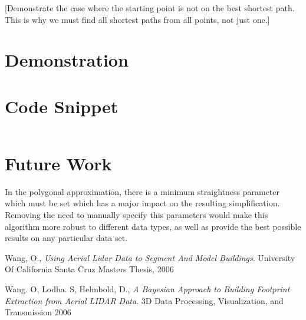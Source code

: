 \documentclass{InsightArticle}
\begin{document}
[Demonstrate the case where the starting point is not on the best shortest path. This is why we must find all shortest paths from all points, not just one.]

\section{Demonstration}
\label{sec:Demonstration}


\section{Code Snippet}

\begin{verbatim}

\end{verbatim}

\section{Future Work}
In the polygonal approximation, there is a minimum straightness parameter which must be set which has a major impact on the resulting simplification. Removing the need to manually specify this parameters would make this algorithm more robust to different data types, as well as provide the best possible results on any particular data set.

\begin{thebibliography}{9}

	  Wang, O.,
	  \emph{Using Aerial Lidar Data to Segment And Model Buildings}.
	  University Of California Santa Cruz Masters Thesis, 2006


	  Wang. O, Lodha. S, Helmbold, D.,
	  \emph{A Bayesian Approach to Building Footprint Extraction from Aerial LIDAR Data}.
	  3D Data Processing, Visualization, and Transmission 2006

\end{thebibliography}
\end{document}
